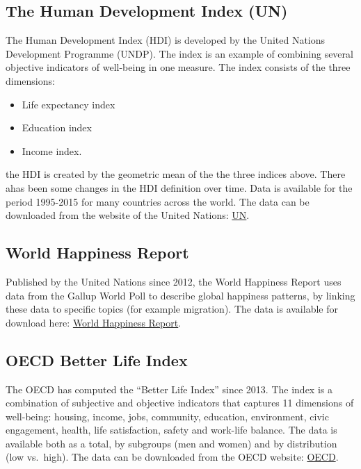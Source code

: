 \documentclass[]{book}
\providecommand{\tightlist}{%
  \setlength{\itemsep}{0pt}\setlength{\parskip}{0pt}}
\begin{document}
\hypertarget{the-human-development-index-un}{%
\subsection{The Human Development Index (UN)}\label{the-human-development-index-un}}

The Human Development Index (HDI) is developed by the United Nations Development Programme (UNDP). The index is an example of combining several objective indicators of well-being in one measure. The index consists of the three dimensions:

\begin{itemize}
\tightlist
\item
  Life expectancy index
\item
  Education index
\item
  Income index.
\end{itemize}

the HDI is created by the geometric mean of the the three indices above. There ahas been some changes in the HDI definition over time. Data is available for the period 1995-2015 for many countries across the world. The data can be downloaded from the website of the United Nations: \href{http://worldhappiness.report/}{UN}.

\hypertarget{world-happiness-report}{%
\subsection{World Happiness Report}\label{world-happiness-report}}

Published by the United Nations since 2012, the World Happiness Report uses data from the Gallup World Poll to describe global happiness patterns, by linking these data to specific topics (for example migration). The data is available for download here: \href{http://worldhappiness.report/}{World Happiness Report}.

\hypertarget{oecd-better-life-index}{%
\subsection{OECD Better Life Index}\label{oecd-better-life-index}}

The OECD has computed the ``Better Life Index'' since 2013. The index is a combination of subjective and objective indicators that captures 11 dimensions of well-being: housing, income, jobs, community, education, environment, civic engagement, health, life satisfaction, safety and work-life balance. The data is available both as a total, by subgroups (men and women) and by distribution (low vs.~high). The data can be downloaded from the OECD website: \href{https://stats.oecd.org/}{OECD}.
\end{document}
